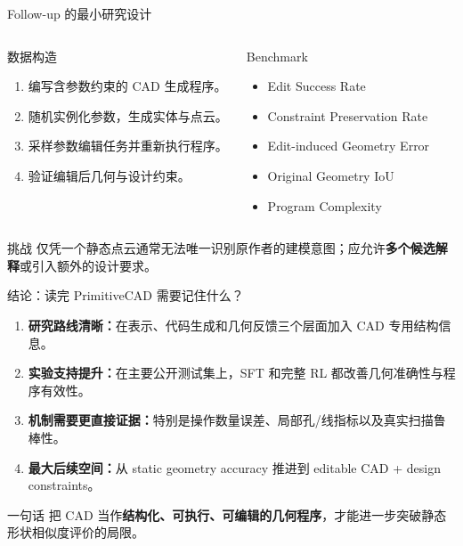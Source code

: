 \documentclass[aspectratio=169,11pt]{beamer}
\newcommand{\tight}{\setlength{\itemsep}{0.24em}}
\begin{document}
\begin{frame}{Follow-up 的最小研究设计}
\small
\begin{columns}[T]
\begin{block}{数据构造}
\begin{enumerate}\tight
\item 编写含参数约束的 CAD 生成程序。
\item 随机实例化参数，生成实体与点云。
\item 采样参数编辑任务并重新执行程序。
\item 验证编辑后几何与设计约束。
\end{enumerate}
\end{block}
\begin{block}{Benchmark}
\begin{itemize}\tight
\item Edit Success Rate
\item Constraint Preservation Rate
\item Edit-induced Geometry Error
\item Original Geometry IoU
\item Program Complexity
\end{itemize}
\end{block}
\end{columns}
\vspace{0.5em}
\begin{block}{挑战}
仅凭一个静态点云通常无法唯一识别原作者的建模意图；应允许\textbf{多个候选解释}或引入额外的设计要求。
\end{block}
\end{frame}

\begin{frame}{结论：读完 PrimitiveCAD 需要记住什么？}
\begin{enumerate}\setlength{\itemsep}{0.95em}
\item \textbf{研究路线清晰：}在表示、代码生成和几何反馈三个层面加入 CAD 专用结构信息。
\item \textbf{实验支持提升：}在主要公开测试集上，SFT 和完整 RL 都改善几何准确性与程序有效性。
\item \textbf{机制需要更直接证据：}特别是操作数量误差、局部孔/线指标以及真实扫描鲁棒性。
\item \textbf{最大后续空间：}从 static geometry accuracy 推进到 editable CAD + design constraints。
\end{enumerate}
\begin{block}{一句话}
把 CAD 当作\textbf{结构化、可执行、可编辑的几何程序}，才能进一步突破静态形状相似度评价的局限。
\end{block}
\end{frame}
\end{document}
